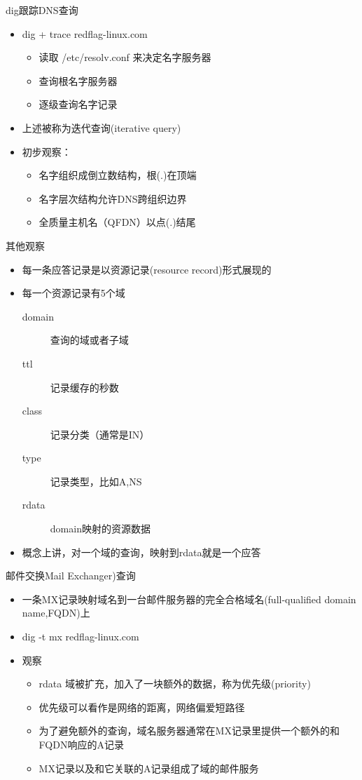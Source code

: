 \begin{frame}{dig跟踪DNS查询}
\begin{itemize}
\item dig + trace redflag-linux.com

\begin{itemize}
\item 读取 /etc/resolv.conf 来决定名字服务器
\item 查询根名字服务器
\item 逐级查询名字记录
\end{itemize}
\item 上述被称为迭代查询(iterative query)
\item 初步观察：

\begin{itemize}
\item 名字组织成倒立数结构，根(.)在顶端
\item 名字层次结构允许DNS跨组织边界
\item 全质量主机名（QFDN）以点(.)结尾
\end{itemize}
\end{itemize}

\end{frame} 
\begin{frame}{其他观察}
\begin{itemize}
\item 每一条应答记录是以资源记录(resource record)形式展现的
\item 每一个资源记录有5个域

\begin{description}
\item [{domain}] 查询的域或者子域
\item [{ttl}] 记录缓存的秒数
\item [{class}] 记录分类（通常是IN）
\item [{type}] 记录类型，比如A,NS
\item [{rdata}] domain映射的资源数据
\end{description}
\item 概念上讲，对一个域的查询，映射到rdata就是一个应答
\end{itemize}

\end{frame} 
\begin{frame}{邮件交换Mail Exchanger)查询}
\begin{itemize}
\item 一条MX记录映射域名到一台邮件服务器的完全合格域名(full-qualified domain name,FQDN)上
\item dig -t mx redflag-linux.com
\item 观察

\begin{itemize}
\item rdata 域被扩充，加入了一块额外的数据，称为优先级(priority)
\item 优先级可以看作是网络的距离，网络偏爱短路径
\item 为了避免额外的查询，域名服务器通常在MX记录里提供一个额外的和FQDN响应的A记录
\item MX记录以及和它关联的A记录组成了域的邮件服务
\end{itemize}
\end{itemize}

\end{frame} 
